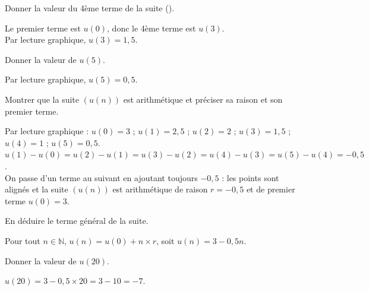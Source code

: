 \documentclass[11pt,a4paper]{article}  %
\begin{document}
\begin{enumMet}
	\item Donner la valeur du 4ème terme de la suite (\danger).
	\par
	\begin{corrBox}
		Le premier terme est $u(0)$, donc le 4ème terme est $u(3)$.\\
		Par lecture graphique, $u(3)=1,5$.
	\end{corrBox}

	\item Donner la valeur de $u(5)$.
	\par
	\begin{corrBox}
		Par lecture graphique, $u(5)=0,5$.
	\end{corrBox}

	\item Montrer que la suite $\left(u(n)\right)$ est arithmétique et préciser sa raison et son premier terme.
	\par
	\begin{corrBox}
		Par lecture graphique : $u(0)=3$ ; $u(1)=2,5$ ; $u(2)=2$ ; $u(3)=1,5$ ; $u(4)=1$ ; $u(5)=0,5$.\\
		$u(1)-u(0)=u(2)-u(1)=u(3)-u(2)=u(4)-u(3)=u(5)-u(4)=-0,5$.\\
		On passe d'un terme au suivant en ajoutant toujours $-0,5$ : les points sont alignés et la suite $\left(u(n)\right)$ est arithmétique de raison $r=-0,5$ et de premier terme $u(0)=3$.
	\end{corrBox}

	\item En déduire le terme général de la suite.
	\par
	\begin{corrBox}
		Pour tout $n\in\mathbb{N}$, $u(n)=u(0)+n\times r$, soit $u(n)=3-0,5n$.
	\end{corrBox}

	\item {} Donner la valeur de $u(20)$.
	\par
	\begin{corrBox}
		$u(20)=3-0,5\times 20=3-10=-7$.
	\end{corrBox}
\end{enumMet}
\end{document}
